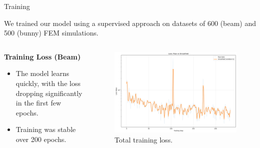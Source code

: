 \documentclass[9pt]{beamer}
\begin{document}
\begin{frame}{Training}
    
    We trained our model using a supervised approach on datasets of 600 (beam) and 500 (bunny) FEM simulations.
    
\begin{columns}
    
    \begin{column}{0.5\textwidth}
            \textbf{Training Loss (Beam)}
            \begin{itemize}
                \item The model learns quickly, with the loss dropping significantly in the first few epochs.
                \item Training was stable over 200 epochs.
            \end{itemize}
    \end{column}
    \begin{column}{0.5\textwidth}
            \begin{figure}
                \includegraphics[width=\textwidth]{Images/training_loss_smoothed_logy.png}
                \caption{Total training loss.}
            \end{figure}

    \end{column}
        
\end{columns}

\end{frame}
\end{document}
